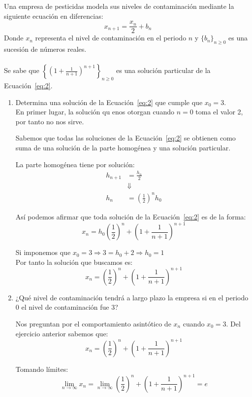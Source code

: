 \documentclass[12pt]{article}
\begin{document}
    \begin{ejercicio}[3 puntos]
    Una empresa de pesticidas modela sus niveles de contaminación mediante la siguiente ecuación en diferencias:
    \begin{equation}\label{eq:2}
    x_{n+1}=\frac{x_n}{2} + b_n
    \end{equation}
    Donde $x_n$ representa el nivel de contaminación en el periodo $n$ y $\{b_n\}_{n\geq 0}$ es una sucesión de números reales.\\\\
    Se sabe que $\left\lbrace\left(1 + \frac{1}{n+1}\right)^{n+1}\right\rbrace_{n\geq 0}$ es una solución particular de la Ecuación~\ref{eq:2}.
    \begin{enumerate}
    \item Determina una solución de la Ecuación~\ref{eq:2} que cumple que $x_0=3$.\\
    
    En primer lugar, la solución qu enos otorgan cuando $n=0$ toma el valor 2, por tanto no nos sirve.
    
    Sabemos que todas las soluciones de la Ecuación~\ref{eq:2} se obtienen como suma de una solución de la parte homogénea y una solución particular.
    
    La parte homogénea tiene por solución:
    \begin{align*}
    h_{n+1}&=\frac{h_n}{2}\\
    &\Downarrow\\
    h_n &= \left(\frac{1}{2}\right)^n h_0
    \end{align*}
    
    Así podemos afirmar que toda solución de la Ecuación~\ref{eq:2} es de la forma:
    \[x_n = h_0\left(\frac{1}{2}\right)^n + \left(1 + \frac{1}{n+1}\right)^{n+1}\]
    
    Si imponemos que $x_0=3 \Rightarrow 3 = h_0 + 2 \Rightarrow h_0=1$\\
    Por tanto la solución que buscamos es:
    \[x_n = \left(\frac{1}{2}\right)^n + \left(1 + \frac{1}{n+1}\right)^{n+1}\]
    \item ¿Qué nivel de contaminación tendrá a largo plazo la empresa si en el periodo 0 el nivel de contaminación fue 3?
    
    Nos preguntan por el comportamiento asintótico de $x_n$ cuando $x_0=3$. Del ejercicio anterior sabemos que:
    \[x_n = \left(\frac{1}{2}\right)^n + \left(1 + \frac{1}{n+1}\right)^{n+1}\]
    
    Tomando límites:
    \[\lim_{n\to\infty}x_n=\lim_{n\to\infty}\left(\frac{1}{2}\right)^n + \left(1 + \frac{1}{n+1}\right)^{n+1} = e\]
    

\end{enumerate}
\end{ejercicio}
\end{document}
